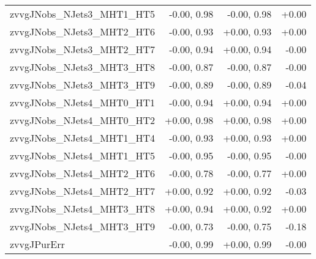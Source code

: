 \begin{tabular}{|l|r|r|r|}
zvvgJNobs\_NJets3\_MHT1\_HT5             &      -0.00, 0.98 &     -0.00, 0.98 &  +0.00 \\
zvvgJNobs\_NJets3\_MHT2\_HT6             &      -0.00, 0.93 &     +0.00, 0.93 &  +0.00 \\
zvvgJNobs\_NJets3\_MHT2\_HT7             &      -0.00, 0.94 &     +0.00, 0.94 &  -0.00 \\
zvvgJNobs\_NJets3\_MHT3\_HT8             &      -0.00, 0.87 &     -0.00, 0.87 &  -0.00 \\
zvvgJNobs\_NJets3\_MHT3\_HT9             &      -0.00, 0.89 &     -0.00, 0.89 &  -0.04 \\
zvvgJNobs\_NJets4\_MHT0\_HT1             &      -0.00, 0.94 &     +0.00, 0.94 &  +0.00 \\
zvvgJNobs\_NJets4\_MHT0\_HT2             &      +0.00, 0.98 &     +0.00, 0.98 &  +0.00 \\
zvvgJNobs\_NJets4\_MHT1\_HT4             &      -0.00, 0.93 &     +0.00, 0.93 &  +0.00 \\
zvvgJNobs\_NJets4\_MHT1\_HT5             &      -0.00, 0.95 &     -0.00, 0.95 &  -0.00 \\
zvvgJNobs\_NJets4\_MHT2\_HT6             &      -0.00, 0.78 &     -0.00, 0.77 &  +0.00 \\
zvvgJNobs\_NJets4\_MHT2\_HT7             &      +0.00, 0.92 &     +0.00, 0.92 &  -0.03 \\
zvvgJNobs\_NJets4\_MHT3\_HT8             &      +0.00, 0.94 &     +0.00, 0.92 &  +0.00 \\
zvvgJNobs\_NJets4\_MHT3\_HT9             &      -0.00, 0.73 &     -0.00, 0.75 &  -0.18 \\
zvvgJPurErr                              &      -0.00, 0.99 &     +0.00, 0.99 &  -0.00 \\
 \hline
\end{tabular}
